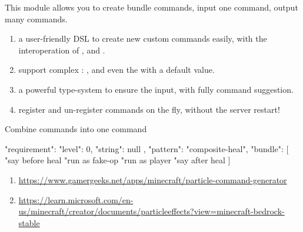 
This module allows you to create bundle commands, input one command, output many commands.


\begin{enumerate}
    \item {a user-friendly DSL to create new custom commands easily, with the interoperation of ,  and .}
    \item {support complex : ,  and even the  with a default value.}
    \item {a powerful type-system to ensure the  input, with fully command suggestion.}
    \item {register and un-register commands on the fly, without the server restart!}
\end{enumerate}

\begin{example}{Combine commands into one command}
    \begin{json}
    {
        "requirement": {
        "level": 0,
        "string": null
    },
        "pattern": "composite-heal",
        "bundle": [
        "say before heal %
        "run as fake-op %
        "run as player %
        "say after heal %
        ]
    }

    \end{json}

\end{example}

\begin{enumerate}
    \item \url{https://www.gamergeeks.net/apps/minecraft/particle-command-generator}
    \item \url{https://learn.microsoft.com/en-us/minecraft/creator/documents/particleeffects?view=minecraft-bedrock-stable}
\end{enumerate}
